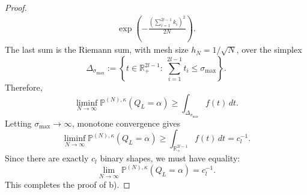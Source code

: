 \documentclass[10pt,a4paper]{amsart}
\begin{document}
\begin{proof}
\begin{align*}
\exp\!\left(-\frac{(\sum_{i=1}^{2l-1}k_i)^2}{2N}\right).
\end{align*}
\medskip
\noindent
The last sum is the Riemann sum, with mesh size \(h_N=1/\sqrt N\), over the
simplex
\[
\Delta_{\sigma_{\max}}
:=
\left\{
t\in\mathbb R_+^{2l-1}:\ \sum_{i=1}^{2l-1}t_i\le \sigma_{\max}
\right\}.
\]
Therefore,
\[
\liminf_{N\to\infty}
\mathbb P^{(N),\kappa}(Q_L=\alpha)
\ge
\int_{\Delta_{\sigma_{\max}}} f(t)\,dt .
\]
\medskip
\noindent
Letting $\sigma_{\max}\to\infty$, monotone convergence gives
\[
\liminf_{N\to\infty}
\mathbb P^{(N),\kappa}(Q_L=\alpha)
\ge
\int_{\mathbb R_+^{2l-1}} f(t)\,dt
=
c_l^{-1}.
\]
\medskip
\noindent
Since there are exactly $c_l$ binary shapes, we must have equality:
\[
\lim_{N\to\infty}
\mathbb P^{(N),\kappa}(Q_L=\alpha)
=
c_l^{-1}.
\]
This completes the proof of b).
\end{proof}
\end{document}
